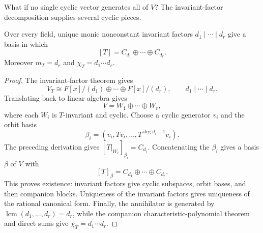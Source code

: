 What if no single cyclic vector generates all of \(V\)? The invariant-factor
decomposition supplies several cyclic pieces.

\begin{theorem}\label{thm:rational-canonical-form}
Over every field, unique monic nonconstant invariant factors
\(d_1\mid\cdots\mid d_r\) give a basis in which
\[
[T]=C_{d_1}\oplus\cdots\oplus C_{d_r}.
\]
Moreover \(m_T=d_r\) and \(\chi_T=d_1\cdots d_r\).
\end{theorem}
\begin{proof}
The invariant-factor theorem gives
\[
V_T\cong F[x]/(d_1)\oplus\cdots\oplus F[x]/(d_r),
\qquad d_1\mid\cdots\mid d_r.
\]
Translating back to linear algebra gives
\[
V=W_1\oplus\cdots\oplus W_r,
\]
where each \(W_i\) is \(T\)-invariant and cyclic. Choose a cyclic generator
\(v_i\) and the orbit basis
\[
\beta_i=(v_i,Tv_i,\ldots,T^{\deg d_i-1}v_i).
\]
The preceding derivation gives
\([T|_{W_i}]_{\beta_i}=C_{d_i}\). Concatenating the \(\beta_i\) gives a
basis \(\beta\) of \(V\) with
\[
[T]_\beta=C_{d_1}\oplus\cdots\oplus C_{d_r}.
\]
This proves existence: invariant factors give cyclic subspaces, orbit bases,
and then companion blocks. Uniqueness of the invariant factors gives
uniqueness of the rational canonical form. Finally, the annihilator is
generated by \(\operatorname{lcm}(d_1,\ldots,d_r)=d_r\), while the companion
characteristic-polynomial theorem and direct sums give
\(\chi_T=d_1\cdots d_r\).
\end{proof}

